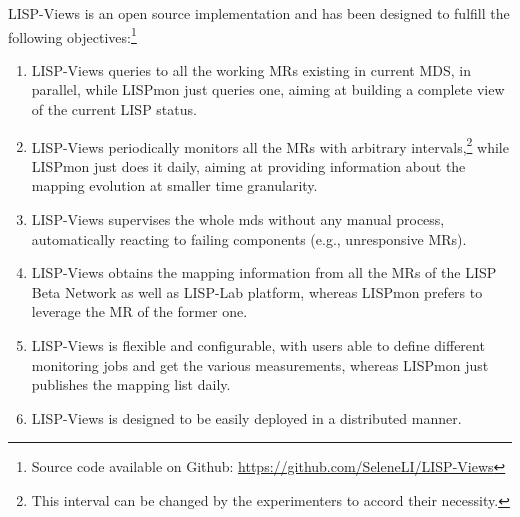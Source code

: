LISP-Views is an open source implementation and has been designed to fulfill the following objectives:\footnote{Source code available on Github: \url{https://github.com/SeleneLI/LISP-Views}} 

\begin{enumerate}[noitemsep,topsep=0pt]
  \item LISP-Views queries to all the working MRs existing in current MDS, in
parallel, while LISPmon just queries one, aiming at building a complete view of
the current LISP status.
  \item LISP-Views periodically monitors all the MRs with arbitrary
  intervals,\footnote{This interval can be changed by the experimenters to accord
  their necessity.} %
  while LISPmon just does it daily, aiming
  at providing information about the mapping evolution at smaller time granularity.
  \item LISP-Views supervises the whole \acrshort{mds} without any manual process,
automatically reacting to failing components (e.g., unresponsive MRs).
  \item LISP-Views obtains the mapping information from all the MRs of the LISP
Beta Network as well as LISP-Lab platform, whereas LISPmon prefers to leverage the
MR of the former one.
  \item LISP-Views is flexible and configurable, with users able to define
different monitoring jobs and get the various measurements, whereas LISPmon
just publishes the mapping list daily.
  \item LISP-Views is designed to be easily deployed in a distributed manner. %
\end{enumerate}


